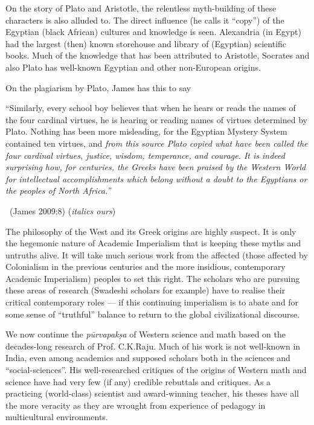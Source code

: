 On the story of Plato and Aristotle, the relentless myth-building of these characters is also alluded to. The direct influence (he calls it “copy”) of the Egyptian (black African) cultures and knowledge is seen. Alexandria (in Egypt) had the largest (then) known storehouse and library of (Egyptian) scientific books. Much of the knowledge that has been attributed to Aristotle, Socrates and also Plato has well-known Egyptian and other non-European origins.

On the plagiarism by Plato, James has this to say

\begin{myquote}
“Similarly, every school boy believes that when he hears or reads the names of the four cardinal virtues, he is hearing or reading names of virtues determined by Plato. Nothing has been more misleading, for the Egyptian Mystery System contained ten virtues, and \textit{from this source Plato copied what have been called the four cardinal virtues, justice, wisdom, temperance, and courage. It is indeed surprising how, for centuries, the Greeks have been praised by the Western World for intellectual accomplishments which belong without a doubt to the Egyptians or the peoples of North Africa.”} 

~\hfill (James 2009:8) (\textit{italics ours})
\end{myquote}

The philosophy of the West and its Greek origins are highly suspect. It is only the hegemonic nature of Academic Imperialism that is keeping these myths and untruths alive. It will take much serious work from the affected (those affected by Colonialism in the previous centuries and the more insidious, contemporary Academic Imperialism) peoples to set this right. The scholars who are pursuing these areas of research (Swadeshi scholars for example) have to realise their critical contemporary roles — if this continuing imperialism is to abate and for some sense of “truthful” balance to return to the global civilizational discourse.

\vskip 3pt

We now continue the \textit{pūrvapakṣa} of Western science and math based on the decades-long research of Prof. C.K.Raju. Much of his work is not well-known in India, even among academics and supposed scholars both in the sciences and “social-sciences”. His well-researched critiques of the origins of Western math and science have had very few (if any) credible rebuttals and critiques. As a practicing (world-class) scientist and award-winning teacher, his theses have all the more veracity as they are wrought from experience of pedagogy in multicultural environments.

